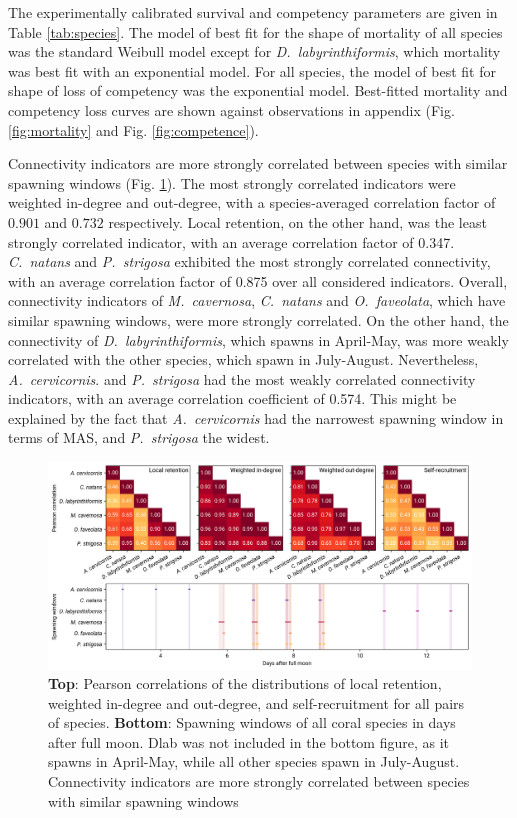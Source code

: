 \documentclass[preprint,12pt,authoryear]{elsarticle}
\begin{document}
The experimentally calibrated survival and competency parameters are given in Table \ref{tab:species}.  The model of best fit for the shape of mortality of all species was the standard Weibull model except for \textit{D.~labyrinthiformis}, which mortality was best fit with an exponential model. For all species, the model of best fit for shape of loss of competency was the exponential model. Best-fitted mortality and competency loss curves are shown against observations in appendix (Fig. \ref{fig:mortality} and Fig. \ref{fig:competence}).

Connectivity indicators are more strongly correlated between species with similar spawning windows (Fig. \ref{fig:correlation}). The most strongly correlated indicators were weighted in-degree and out-degree, with a species-averaged correlation factor of $0.901$ and $0.732$ respectively. Local retention, on the other hand, was the least strongly correlated indicator, with an average correlation factor of 0.347. \textit{C.~natans} and \textit{P.~strigosa} exhibited the most strongly correlated connectivity, with an average correlation factor of 0.875 over all considered indicators. Overall, connectivity indicators of \textit{M.~cavernosa}, \textit{C.~natans} and \textit{O.~faveolata}, which have similar spawning windows, were more strongly correlated. On the other hand, the connectivity of \textit{D.~labyrinthiformis}, which spawns in April-May, was more weakly correlated with the other species, which spawn in July-August. Nevertheless, \textit{A.~cervicornis}. and \textit{P.~strigosa} had the most weakly correlated connectivity indicators, with an average correlation coefficient of 0.574. This might be explained by the fact that \textit{A.~cervicornis} had the narrowest spawning window in terms of MAS, and \textit{P.~strigosa} the widest.

\begin{figure}
    \centering
    \includegraphics[width=\textwidth]{figures/fig_correlation.png}
    \caption{\textbf{Top}: Pearson correlations of the distributions of local retention, weighted in-degree and out-degree, and self-recruitment for all pairs of species. \textbf{Bottom}: Spawning windows of all coral species in days after full moon. Dlab was not included in the bottom figure, as it spawns in April-May, while all other species spawn in July-August. Connectivity indicators are more strongly correlated between species with similar spawning windows}\label{fig:correlation}
\end{figure}
\end{document}
